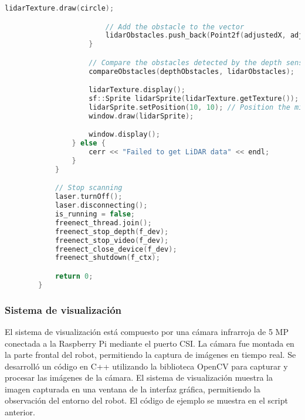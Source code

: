 \begin{lstlisting}[language={C++}, caption={C\'odigo de ejemplo de Kinect y LiDAR}, label={fresd}]
                        lidarTexture.draw(circle);

                        // Add the obstacle to the vector
                        lidarObstacles.push_back(Point2f(adjustedX, adjustedY));
                    }

                    // Compare the obstacles detected by the depth sensor and LiDAR
                    compareObstacles(depthObstacles, lidarObstacles);

                    lidarTexture.display();
                    sf::Sprite lidarSprite(lidarTexture.getTexture());
                    lidarSprite.setPosition(10, 10); // Position the minimap at the top-left corner
                    window.draw(lidarSprite);

                    window.display();
                } else {
                    cerr << "Failed to get LiDAR data" << endl;
                }
            }

            // Stop scanning
            laser.turnOff();
            laser.disconnecting();
            is_running = false;
            freenect_thread.join();
            freenect_stop_depth(f_dev);
            freenect_stop_video(f_dev);
            freenect_close_device(f_dev);
            freenect_shutdown(f_ctx);

            return 0;
        }

    \end{lstlisting}

    \subsubsection{Sistema de visualizaci\'on}
    El sistema de visualizaci\'on est\'a compuesto por una c\'amara infrarroja de 5 MP
        conectada a la Raspberry Pi mediante el puerto CSI. La c\'amara fue montada en la parte
        frontal del robot, permitiendo la captura de im\'agenes en tiempo real.
    \vskip 0.5cm
    Se desarroll\'o un c\'odigo en C++ utilizando la biblioteca OpenCV para capturar y
        procesar las im\'agenes de la c\'amara. El sistema de visualizaci\'on muestra la imagen
        capturada en una ventana de la interfaz gr\'afica, permitiendo la observaci\'on del entorno
        del robot. El c\'odigo de ejemplo se muestra en el script anterior.
    \vskip 0.5cm

